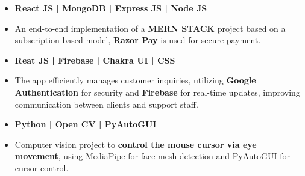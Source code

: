 






\begin{itemize}
\item \textbf{React JS | MongoDB | Express JS | Node JS }
\item An end-to-end implementation of a \textbf{MERN STACK} project based on a subscription-based model, \textbf{Razor Pay} is used for secure payment.
\end{itemize}
\smallskip
{}
\begin{itemize}
\item \textbf{Reat JS | Firebase | Chakra UI | CSS }
\item 
The app efficiently manages customer inquiries, utilizing \textbf{Google Authentication} for security and \textbf{Firebase} for real-time updates, improving communication between clients and support staff.
\end{itemize}
\smallskip
\smallskip
{}
\begin{itemize}
\item \textbf{Python | Open CV | PyAutoGUI}
\item Computer vision project to \textbf{control the mouse cursor via eye movement}, using MediaPipe for face mesh detection and PyAutoGUI for cursor control.\
\end{itemize}
\smallskip

